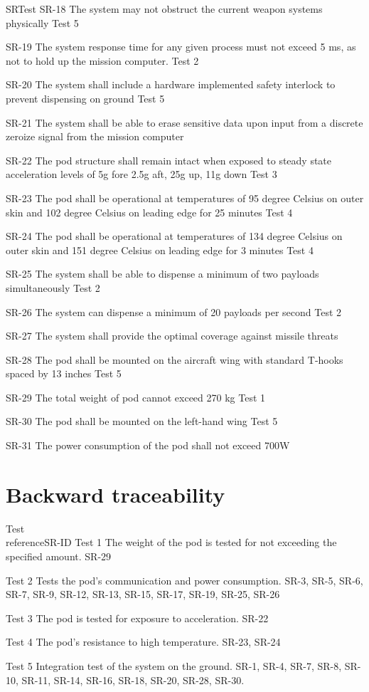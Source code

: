 \documentclass[Main]{subfiles}
\begin{document}
\begin{TraceForward}{SR}{Test}
\TF
{SR-18}
{The system may not obstruct the current weapon systems physically}
{Test 5}

\TF
{SR-19}
{The system response time for any given process must not exceed 5 ms, as not to hold up the mission computer.}
{Test 2}

\TF
{SR-20}
{The system shall include a hardware implemented safety interlock to prevent dispensing on ground}
{Test 5}

\TF
{SR-21}
{The system shall be able to erase sensitive data upon input from a discrete zeroize signal from the mission computer}
{}

\TF
{SR-22}
{The pod structure shall remain intact when exposed to steady state acceleration levels of 5g fore 2.5g aft, 25g up, 11g down}
{Test 3}

\TF
{SR-23}
{The pod shall be operational at temperatures of 95 degree Celsius on outer skin and 102 degree Celsius on leading edge for 25 minutes}
{Test 4}

\TF
{SR-24}
{The pod shall be operational at temperatures of 134 degree Celsius on outer skin and 151 degree Celsius on leading edge for 3 minutes}
{Test 4}

\TF
{SR-25}
{The system shall be able to dispense a minimum of two payloads simultaneously}
{Test 2}

\TF
{SR-26}
{The system can dispense a minimum of 20 payloads per second}
{Test 2}

\TF
{SR-27}
{The system shall provide the optimal coverage against	missile threats}
{}

\TF
{SR-28}
{The pod shall be mounted on the aircraft wing with standard T-hooks spaced by 13 inches}
{Test 5}

\TF
{SR-29}
{The total weight of pod cannot exceed 270 kg}
{Test 1}

\TF
{SR-30}
{The pod shall be mounted on the left-hand wing}
{Test 5}

\TF
{SR-31}
{The power consumption of the pod shall not exceed 700W}
{}

\end{TraceForward}

\chapter{Backward traceability}

\begin{TraceBackward}{Test\\reference}{SR-ID}
\TB
{Test 1}
{The weight of the pod is tested for not exceeding the specified amount.}
{SR-29}

\TB
{Test 2}
{Tests the pod's communication and power consumption.}
{SR-3, SR-5, SR-6, SR-7, SR-9, SR-12, SR-13, SR-15, SR-17, SR-19, SR-25, SR-26}

\TB
{Test 3}
{The pod is tested for exposure to acceleration.}
{SR-22}

\TB
{Test 4}
{The pod's resistance to high temperature.}
{SR-23, SR-24}

\TB
{Test 5}
{Integration test of the system on the ground.}
{SR-1, SR-4, SR-7, SR-8, SR-10, SR-11, SR-14, SR-16, SR-18, SR-20, SR-28, SR-30.}

\end{TraceBackward}
\end{document}

